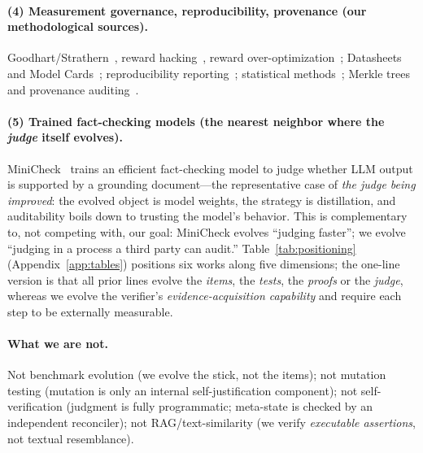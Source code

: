 \documentclass{article}
\begin{document}
\paragraph{(4) Measurement governance, reproducibility, provenance (our methodological sources).}
Goodhart/Strathern~\cite{goodhart1975problems,strathern1997improving}, reward
hacking~\cite{skalse2022rewardhacking}, reward over-optimization~\cite{gao2023scaling};
Datasheets~\cite{gebru2021datasheets} and Model Cards~\cite{mitchell2019modelcards};
reproducibility reporting~\cite{pineau2021improving}; statistical methods~\cite{clopper1934use,
fisher1935design,mcnemar1947note,benjamini1995controlling,holm1979simple,cohen1960coefficient};
Merkle trees~\cite{merkle1988digital} and provenance auditing~\cite{kao2025constantsize,wang2026whoaudits}.

\paragraph{(5) Trained fact-checking models (the nearest neighbor where the \emph{judge} itself evolves).}
MiniCheck~\cite{tang2024minicheck} trains an efficient fact-checking model to judge whether LLM
output is supported by a grounding document---the representative case of \emph{the judge being
improved}: the evolved object is model weights, the strategy is distillation, and auditability
boils down to trusting the model's behavior. This is complementary to, not competing with, our
goal: MiniCheck evolves ``judging faster''; we evolve ``judging in a process a third party can
audit.'' Table~\ref{tab:positioning} (Appendix~\ref{app:tables}) positions six works along five
dimensions; the one-line version is that all prior lines evolve the \emph{items}, the \emph{tests},
the \emph{proofs} or the \emph{judge}, whereas we evolve the verifier's \emph{evidence-acquisition
capability} and require each step to be externally measurable.


\paragraph{What we are not.} Not benchmark evolution (we evolve the stick, not the items); not
mutation testing (mutation is only an internal self-justification component); not
self-verification (judgment is fully programmatic; meta-state is checked by an independent
reconciler); not RAG/text-similarity (we verify \emph{executable assertions}, not textual
resemblance).

\end{document}
